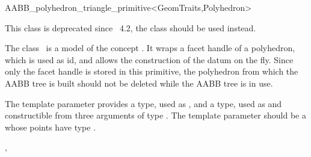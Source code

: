 \ccRefPageBegin



\begin{ccRefClass}{AABB_polyhedron_triangle_primitive<GeomTraits,Polyhedron>}


This class is deprecated since \cgal\ 4.2, the class  should be used instead.

\begin{ccDeprecated}
\ccDefinition
  
The class \ccRefName\ is a model of the concept . It wraps a facet handle of a polyhedron, which is used as id, and allows the construction of the datum on the fly. Since only the facet handle is stored in this primitive, the polyhedron from which the AABB tree is built should not be deleted while the AABB tree is in use.

\ccParameters
The template parameter  provides a  type, used as , and a  type, used as  and constructible from three arguments of type . The template parameter  should be a  whose points have type .


\ccTypes

\ccGlue
{}

\ccSeeAlso

,\\
\\
\end{ccDeprecated}

\end{ccRefClass}

\ccRefPageEnd

